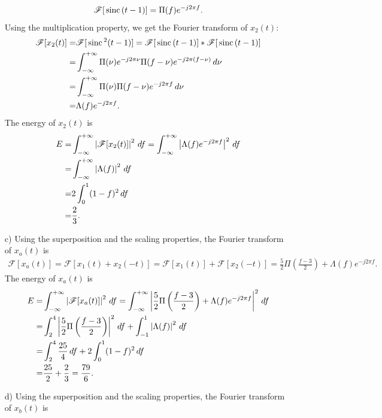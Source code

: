 \documentclass{assignment}
\begin{document}
\begin{sol}
\begin{itemize}
        \begin{align}
            \mathscr{F}[\,\text{sinc}\,(t-1)]=\Pi(f)e^{-j2\pi f}.
        \end{align}
        Using the multiplication property, we get the Fourier transform of $x_2(t)$:
        \begin{align}
            \notag\mathscr{F}[x_2(t)]=&\mathscr{F}[\,\text{sinc}\,^2(t-1)]=\mathscr{F}[\,\text{sinc}\,(t-1)]*\mathscr{F}[\,\text{sinc}\,(t-1)]\\
            \notag=&\int_{-\infty}^{+\infty}\Pi(\nu)e^{-j2\pi\nu}\Pi(f-\nu)e^{-j2\pi(f-\nu)}\,d\nu\\
            \notag=&\int_{-\infty}^{+\infty}\Pi(\nu)\Pi(f-\nu)e^{-j2\pi f}\,d\nu\\
            =&\Lambda(f)e^{-j2\pi f}.
        \end{align}
        The energy of $x_2(t)$ is
        \begin{align}
            \notag E=&\int_{-\infty}^{+\infty}\left\lvert\mathscr{F}[x_2(t)]\right\rvert^2\,df=\int_{-\infty}^{+\infty}\left\lvert\Lambda(f)e^{-j2\pi f}\right\rvert^2\,df\\
            \notag=&\int_{-\infty}^{+\infty}\left\lvert\Lambda(f)\right\rvert^2\,df\\
            \notag=&2\int_0^1(1-f)^2\,df\\
            \notag=&\frac{2}{3}.
        \end{align}
        \item[c)] Using the superposition and the scaling properties, the Fourier transform of $x_a(t)$ is
        \begin{align}
            \mathscr{F}[x_a(t)]=\mathscr{F}[x_1(t)+x_2(-t)]=\mathscr{F}[x_1(t)]+\mathscr{F}[x_2(-t)]=\frac{5}{2}\Pi\left(\frac{f-3}{2}\right)+\Lambda(f)e^{-j2\pi f}.
        \end{align}
        The energy of $x_a(t)$ is
        \begin{align}
            \notag E=&\int_{-\infty}^{+\infty}\left\lvert\mathscr{F}[x_a(t)]\right\rvert^2\,df=\int_{-\infty}^{+\infty}\left\lvert\frac{5}{2}\Pi\left(\frac{f-3}{2}\right)+\Lambda(f)e^{-j2\pi f}\right\rvert^2\,df\\
            \notag=&\int_2^4\left\lvert\frac{5}{2}\Pi\left(\frac{f-3}{2}\right)\right\rvert^2\,df+\int_{-1}^1\left\lvert\Lambda(f)\right\rvert^2\,df\\
            \notag=&\int_2^4\frac{25}{4}\,df+2\int_0^1(1-f)^2\,df\\
            =&\frac{25}{2}+\frac{2}{3}=\frac{79}{6}.
        \end{align}
        \item[d)] Using the superposition and the scaling properties, the Fourier transform of $x_b(t)$ is

\end{itemize}
\end{sol}
\end{document}
